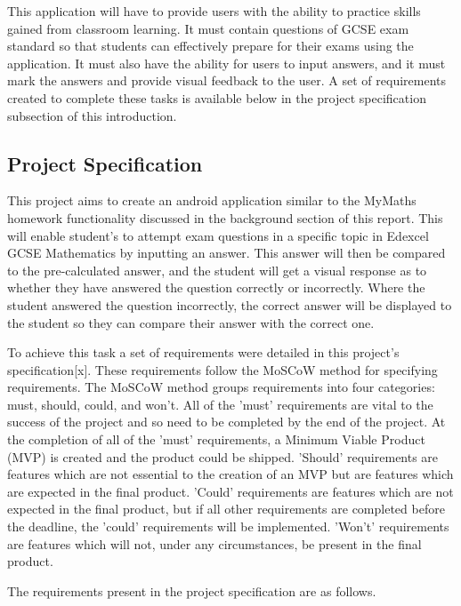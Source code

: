 \documentclass{article}
\begin{document}
This application will have to provide users with the ability to practice skills gained from classroom learning. It must contain questions of GCSE exam standard so that students can effectively prepare for their exams using the application. It must also have the ability for users to input answers, and it must mark the answers and provide visual feedback to the user. A set of requirements created to complete these tasks is available below in the project specification subsection of this introduction. \par

\subsection{Project Specification}

This project aims to create an android application similar to the MyMaths homework functionality discussed in the background section of this report. This will enable student's to attempt exam questions in a specific topic in Edexcel GCSE Mathematics by inputting an answer. This answer will then be compared to the pre-calculated answer, and the student will get a visual response as to whether they have answered the question correctly or incorrectly. Where the student answered the question incorrectly, the correct answer will be displayed to the student so they can compare their answer with the correct one. \par

To achieve this task a set of requirements were detailed in this project's specification[x]. These requirements follow the MoSCoW method for specifying requirements. The MoSCoW method groups requirements into four categories: must, should, could, and won't. All of the 'must' requirements are vital to the success of the project and so need to be completed by the end of the project. At the completion of all of the 'must' requirements, a Minimum Viable Product (MVP) is created and the product could be shipped. 'Should' requirements are features which are not essential to the creation of an MVP but are features which are expected in the final product. 'Could' requirements are features which are not expected in the final product, but if all other requirements are completed before the deadline, the 'could' requirements will be implemented. 'Won't' requirements are features which will not, under any circumstances, be present in the final product. \par

The requirements present in the project specification are as follows. \par
\end{document}
